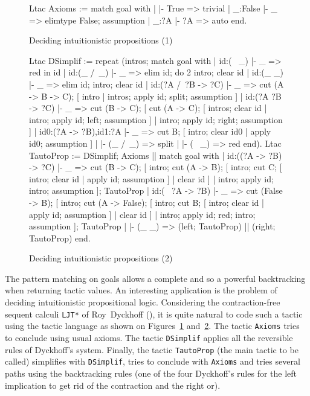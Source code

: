 \begin{figure}[b]
\begin{centerframe}
\begin{coq_example}
Ltac Axioms :=
  match goal with
  | |- True => trivial
  | _:False |- _  => elimtype False; assumption
  | _:?A |- ?A  => auto
  end.
\end{coq_example}
\end{centerframe}
\caption{Deciding intuitionistic propositions (1)}
\label{tautoltaca}
\end{figure}


\begin{figure}
\begin{centerframe}
\begin{coq_example}
Ltac DSimplif :=
  repeat
   (intros;
    match goal with
     | id:(~ _) |- _ => red in id
     | id:(_ /\ _) |- _ =>
         elim id; do 2 intro; clear id
     | id:(_ \/ _) |- _ =>
         elim id; intro; clear id
     | id:(?A /\ ?B -> ?C) |- _ =>
         cut (A -> B -> C);
          [ intro | intros; apply id; split; assumption ]
     | id:(?A \/ ?B -> ?C) |- _ =>
         cut (B -> C);
          [ cut (A -> C);
             [ intros; clear id
             | intro; apply id; left; assumption ]
          | intro; apply id; right; assumption ]
     | id0:(?A -> ?B),id1:?A |- _ =>
         cut B; [ intro; clear id0 | apply id0; assumption ]
     | |- (_ /\ _) => split
     | |- (~ _) => red
     end).
Ltac TautoProp :=
  DSimplif;
   Axioms ||
     match goal with
     | id:((?A -> ?B) -> ?C) |- _ =>
          cut (B -> C);
          [ intro; cut (A -> B);
             [ intro; cut C;
                [ intro; clear id | apply id; assumption ]
             | clear id ]
          | intro; apply id; intro; assumption ]; TautoProp
     | id:(~ ?A -> ?B) |- _ =>
         cut (False -> B);
          [ intro; cut (A -> False);
             [ intro; cut B;
                [ intro; clear id | apply id; assumption ]
             | clear id ]
          | intro; apply id; red; intro; assumption ]; TautoProp
     | |- (_ \/ _) => (left; TautoProp) || (right; TautoProp)
     end.
\end{coq_example}
\end{centerframe}
\caption{Deciding intuitionistic propositions (2)}
\label{tautoltacb}
\end{figure}

The pattern matching on goals allows a complete and so a powerful
backtracking when returning tactic values. An interesting application
is the problem of deciding intuitionistic propositional logic.
Considering the contraction-free sequent calculi {\tt LJT*} of
Roy~Dyckhoff (\cite{Dyc92}), it is quite natural to code such a tactic
using the tactic language as shown on Figures~\ref{tautoltaca}
and~\ref{tautoltacb}. The tactic {\tt Axioms} tries to conclude using
usual axioms. The tactic {\tt DSimplif} applies all the reversible
rules of Dyckhoff's system. Finally, the tactic {\tt TautoProp} (the
main tactic to be called) simplifies with {\tt DSimplif}, tries to
conclude with {\tt Axioms} and tries several paths using the
backtracking rules (one of the four Dyckhoff's rules for the left
implication to get rid of the contraction and the right or).

